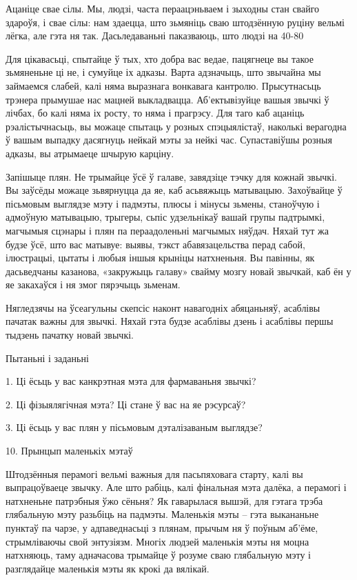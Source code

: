 Ацаніце свае сілы. Мы, людзі, часта пераацэньваем і зыходны стан свайго здароўя, і свае сілы: нам здаецца, што зьмяніць сваю штодзённую руціну вельмі лёгка, але гэта ня так. Дасьледаваньні паказваюць, што людзі на 40-80%

Для цікавасьці, спытайце ў тых, хто добра вас ведае, пацягнеце вы такое зьмяненьне ці не, і сумуйце іх адказы. Варта адзначыць, што звычайна мы займаемся слабей, калі няма выразнага вонкавага кантролю. Прысутнасьць трэнера прымушае нас мацней выкладвацца. Аб'ектывізуйце вашыя звычкі ў лічбах, бо калі няма іх росту, то няма і прагрэсу. Для таго каб ацаніць рэалістычнасьць, вы можаце спытаць у розных спэцыялістаў, наколькі верагодна ў вашым выпадку дасягнуць нейкай мэты за нейкі час. Супаставіўшы розныя адказы, вы атрымаеце шчырую карціну.

Запішыце плян. Не трымайце ўсё ў галаве, завядзіце тэчку для кожнай звычкі. Вы заўсёды можаце зьвярнуцца да яе, каб асьвяжыць матывацыю. Захоўвайце ў пісьмовым выглядзе мэту і падмэты, плюсы і мінусы зьмены, станоўчую і адмоўную матывацыю, трыгеры, сьпіс удзельнікаў вашай групы падтрымкі, магчымыя сцэнары і плян па пераадоленьні магчымых няўдач. Няхай тут жа будзе ўсё, што вас матывуе: выявы, тэкст абавязацельства перад сабой, ілюстрацыі, цытаты і любыя іншыя крыніцы натхненьня. Вы павінны, як дасьведчаны казанова, «закружыць галаву» свайму мозгу новай звычкай, каб ён у яе закахаўся і ня змог пярэчыць зьменам.

Нягледзячы на ўсеагульны скепсіс наконт навагодніх абяцаньняў, асаблівы пачатак важны для звычкі. Няхай гэта будзе асаблівы дзень і асаблівы першы тыдзень пачатку новай звычкі.

Пытаньні і заданьні

1. Ці ёсьць у вас канкрэтная мэта для фармаваньня звычкі?

2. Ці фізыялягічная мэта? Ці стане ў вас на яе рэсурсаў?

3. Ці ёсьць у вас плян у пісьмовым дэталізаваным выглядзе?


10. Прынцып маленькіх мэтаў

Штодзённыя перамогі вельмі важныя для пасьпяховага старту, калі вы выпрацоўваеце звычку. Але што рабіць, калі фінальная мэта далёка, а перамогі і натхненьне патрэбныя ўжо сёньня? Як гаварылася вышэй, для гэтага трэба глябальную мэту разьбіць на падмэты. Маленькія мэты – гэта выкананьне пунктаў па чарзе, у адпаведнасьці з плянам, прычым ня ў поўным аб'ёме, стрымліваючы свой энтузіязм. Многіх людзей маленькія мэты ня моцна натхняюць, таму адначасова трымайце ў розуме сваю глябальную мэту і разглядайце маленькія мэты як крокі да вялікай.

